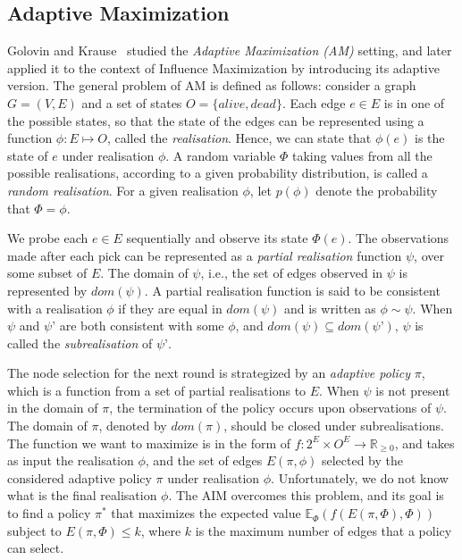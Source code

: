 \subsection{Adaptive Maximization} 


Golovin and Krause~\cite{Golovin2011} studied the {\em Adaptive Maximization (AM)} setting, and later applied it to the context of Influence Maximization by introducing its adaptive version. The general problem of AM is defined as follows: consider a graph $G=(V,E)$ and a set of states $O = \{alive, dead\}$. Each edge $e \in E$ is in one of the possible states, so that the state of the edges can be represented using a function $\phi: E \mapsto O$, called the \emph{realisation}. Hence, we can state that $\phi(e)$ is the state of $e$ under realisation $\phi$. A random variable $\Phi$ taking values from all the possible realisations, according to a given probability distribution, is called a {\em random realisation}. For a given realisation $\phi$, let $p(\phi)$ denote the probability that $\Phi=\phi$.

We probe each $e \in E$ sequentially and observe its state $\Phi(e)$. The observations made after each pick can be represented as a \emph{partial realisation} function $\psi$, over some subset of $E$. The domain of $\psi$, i.e., the set of edges observed in $\psi$ is represented by $dom(\psi)$. A partial realisation function is said to be consistent with a realisation $\phi$ if they are equal in $dom(\psi)$ and is written as $\phi \sim \psi$. When $\psi$ and $\psi’$ are both consistent with some $\phi$, and $dom(\psi) \subseteq dom(\psi’)$, $\psi$ is called the \emph{subrealisation} of $\psi’$. 

The node selection for the next round is strategized by an \emph{adaptive policy} $\pi$, which is a function from a set of partial realisations to $E$. When $\psi$ is not present in the domain of $\pi$, the termination of the policy occurs upon observations of $\psi$. The domain of $\pi$, denoted by $dom(\pi)$, should be closed under subrealisations. The function we want to maximize is in the form of $f:2^E\times O^E\rightarrow \mathbb{R}_{\geq 0}$, and takes as input the realisation $\phi$, and the set of edges $E(\pi, \phi)$ selected by the considered adaptive policy $\pi$ under realisation $\phi$. Unfortunately, we do not know what is the final realisation $\phi$. The AIM overcomes this problem, and its goal is to find a policy $\pi^*$ that maximizes the expected value $\mathbb{E}_{\Phi}(f(E(\pi,\Phi),\Phi))$ subject to $E(\pi,\Phi)\leq k$, where $k$ is the maximum number of edges that a policy can select.





